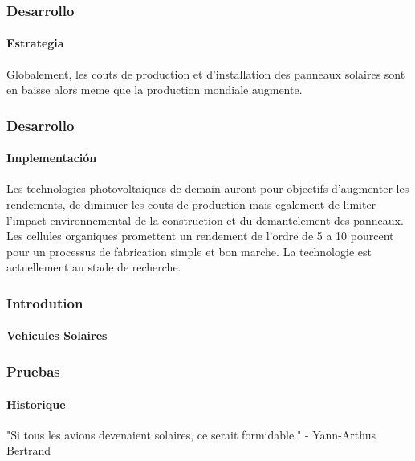 \documentclass{beamer}
\begin{document}
\begin{frame}
\frametitle{Desarrollo}
\framesubtitle{Estrategia}
Globalement, les couts de production et d'installation des panneaux solaires sont en baisse alors meme que la production mondiale augmente.
\begin{figure}
\end{figure}
\begin{figure}
\end{figure}

\end{frame}

\begin{frame}
\frametitle{Desarrollo}
\framesubtitle{Implementaci\'{o}n}
Les technologies photovoltaiques de demain auront pour objectifs d'augmenter les rendements, de diminuer les couts de production mais egalement de limiter l'impact environnemental de la construction et du demantelement des panneaux. Les cellules organiques promettent un rendement de l'ordre de 5 a 10 pourcent  pour un processus de fabrication simple et bon marche. La technologie est actuellement au stade de recherche.

\end{frame}

\begin{frame}
\frametitle{Introdution}
\framesubtitle{Vehicules Solaires}

\end{frame}


\begin{frame}
\frametitle{Pruebas}
\framesubtitle{Historique}
"Si tous les avions devenaient solaires, ce serait formidable." - Yann-Arthus Bertrand

\begin{figure}
\end{figure}

\end{frame}


\end{document}
